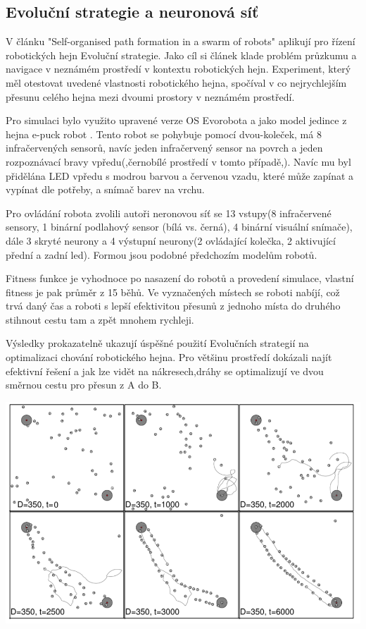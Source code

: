 \subsection{Evoluční strategie a neuronová síť}
V článku "Self-organised path formation in a swarm of robots" \citep{sperati2011self} aplikují pro řízení robotických hejn Evoluční strategie. Jako cíl si článek klade problém průzkumu a navigace v neznámém prostředí v kontextu robotických hejn. Experiment, který měl otestovat uvedené vlastnosti robotického hejna, spočíval v co nejrychlejším přesunu celého hejna mezi dvoumi prostory v neznámém prostředí. 
\par 
Pro simulaci bylo využito upravené verze OS Evorobota a jako model jedince z hejna e-puck robot \citep{mondada2009puck}. Tento robot se pohybuje pomocí dvou-koleček, má 8 infračervených sensorů, navíc jeden infračervený sensor na povrch a jeden rozpoznávací bravy vpředu(,černobílé prostředí v tomto případě,). Navíc mu byl přidělána LED vpředu s modrou barvou a červenou vzadu, které může zapínat a vypínat dle potřeby, a snímač barev na vrchu. 
\par
Pro ovládání robota zvolili autoři neronovou síť se 13 vstupy(8 infračervené sensory, 1 binární podlahový sensor (bílá vs. černá), 4 binární visuální snímače), dále 3 skryté neurony a 4 výstupní neurony(2 ovládající kolečka, 2 aktivující přední a zadní led). Formou jsou podobné předchozím modelům robotů. 
\par
Fitness funkce je vyhodnoce po nasazení do robotů a provedení simulace, vlastní fitness je pak průměr z 15 běhů. Ve vyznačených místech se roboti nabíjí, což trvá daný čas a roboti s lepší efektivitou přesunů z jednoho místa do druhého stihnout cestu tam a zpět mnohem rychleji.
\par 
Výsledky prokazatelně ukazují úspěšné použití Evolučních strategií na optimalizaci chování robotického hejna. Pro většinu prostředí dokázali najít efektivní řešení a jak lze vidět na nákresech,dráhy se optimalizují ve dvou směrnou cestu pro přesun z A do B.
\par
\begin{center}
    \includegraphics[scale=0.8]{../img/drahyEs.png}
\end{center}


